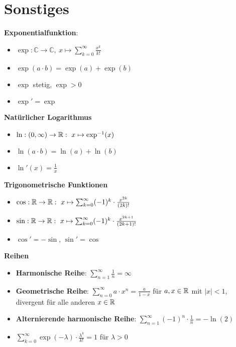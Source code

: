 \section{Sonstiges}


\textbf{Exponentialfunktion}:
\begin{itemize}
\item $\exp:\mathbb{C}\to\mathbb{C},\ x\mapsto\sum_{k=0}^\infty \frac{x^k}{k!}$

\item $\exp(a\cdot b)=\exp(a)+\exp(b)$

\item $\exp$ stetig, $\exp>0$

\item $\exp'=\exp$
\end{itemize}

\textbf{Natürlicher Logarithmus}
\begin{itemize}
\item $\ln: (0,\infty)\to\R:\ x\mapsto\exp^{-1}(x)$

\item $\ln(a\cdot b)=\ln(a)+\ln(b)$

\item $\ln'(x)=\frac{1}{x}$
\end{itemize}

\textbf{Trigonometrische Funktionen}
\begin{itemize}
\item $\cos:\R\to\R:\ x\mapsto\sum_{k=0}^\infty (-1)^k\cdot\frac{x^{2k}}{(2k)!}$

\item $\sin:\R\to\R:\ x\mapsto\sum_{k=0}^\infty (-1)^k\cdot\frac{x^{2k+1}}{(2k+1)!}$

\item $\cos' = -\sin$, $\sin' = \cos$
\end{itemize}

\textbf{Reihen}
\begin{itemize}
\item \textbf{Harmonische Reihe}: $\sum_{n=1}^\infty \frac{1}{n}=\infty$

\item \textbf{Geometrische Reihe}: $\sum_{n=0}^\infty a\cdot x^n = \frac{a}{1-x}$
für $a,x\in\mathbb{R}$ mit $|x|<1$, divergent für alle anderen $x\in\mathbb{R}$

\item \textbf{Alternierende harmonische Reihe}:
$\sum_{n=1}^\infty (-1)^n\cdot\frac{1}{n}=-\ln(2)$

\item $\sum_{k=0}^\infty\exp(-\lambda)\cdot\frac{\lambda^k}{k!}=1$ für $\lambda>0$
\end{itemize}